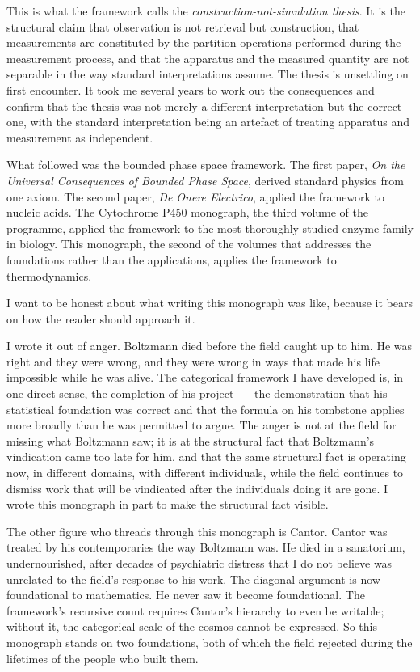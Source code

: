 This is what the framework calls the \emph{construction-not-simulation thesis}.
It is the structural claim that observation is not retrieval but construction, that
measurements are constituted by the partition operations performed during the
measurement process, and that the apparatus and the measured quantity are not
separable in the way standard interpretations assume. The thesis is unsettling on
first encounter. It took me several years to work out the consequences and confirm
that the thesis was not merely a different interpretation but the correct one, with
the standard interpretation being an artefact of treating apparatus and measurement
as independent.

What followed was the bounded phase space framework. The first paper, \textit{On the
Universal Consequences of Bounded Phase Space}, derived standard physics from one
axiom. The second paper, \textit{De Onere Electrico}, applied the framework to
nucleic acids. The Cytochrome P450 monograph, the third volume of the programme,
applied the framework to the most thoroughly studied enzyme family in biology.
This monograph, the second of the volumes that addresses the foundations rather than
the applications, applies the framework to thermodynamics.

\medskip

I want to be honest about what writing this monograph was like, because it bears on
how the reader should approach it.

I wrote it out of anger. Boltzmann died before the field caught up to him. He was right
and they were wrong, and they were wrong in ways that made his life impossible while
he was alive. The categorical framework I have developed is, in one direct sense, the
completion of his project~--- the demonstration that his statistical foundation was
correct and that the formula on his tombstone applies more broadly than he was
permitted to argue. The anger is not at the field for missing what Boltzmann saw;
it is at the structural fact that Boltzmann's vindication came too late for him,
and that the same structural fact is operating now, in different domains, with
different individuals, while the field continues to dismiss work that will be
vindicated after the individuals doing it are gone. I wrote this monograph in part
to make the structural fact visible.

The other figure who threads through this monograph is Cantor. Cantor was treated by
his contemporaries the way Boltzmann was. He died in a sanatorium, undernourished,
after decades of psychiatric distress that I do not believe was unrelated to the
field's response to his work. The diagonal argument is now foundational to mathematics.
He never saw it become foundational. The framework's recursive count requires Cantor's
hierarchy to even be writable; without it, the categorical scale of the cosmos cannot
be expressed. So this monograph stands on two foundations, both of which the field
rejected during the lifetimes of the people who built them.


